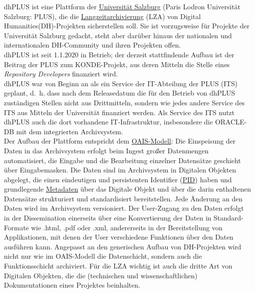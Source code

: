 \documentclass{article}
\begin{document}
    dhPLUS ist eine Plattform der \href{http://gams.uni-graz.at/o:konde.203}{Universität Salzburg} (Paris Lodron Universität Salzburg: PLUS), die die \href{http://gams.uni-graz.at/o:konde.6}{Langzeitarchivierung} (LZA) von Digital Humanities(DH)-Projekten sicherstellen soll. Sie ist vorzugsweise für Projekte der Universität Salzburg gedacht, steht aber darüber hinaus der nationalen und internationalen DH-Community und ihren Projekten offen.   	        	\\
            
        dhPLUS ist seit 1.1.2020 in Betrieb; der derzeit stattfindende Aufbau ist der Beitrag der PLUS zum KONDE-Projekt, aus deren Mitteln die Stelle eines \emph{Repository Developers} finanziert wird.\\
            
        dhPLUS war von Beginn an als ein Service der IT-Abteilung der PLUS (ITS) geplant, d. h. dass nach dem Releasedatum die für den Betrieb von dhPLUS zuständigen Stellen nicht aus Drittmitteln, sondern wie jedes andere Service des ITS aus Mitteln der Universität finanziert werden. Als Service des ITS nutzt dhPLUS auch die dort vorhandene IT-Infrastruktur, insbesondere die ORACLE-DB mit dem integrierten Archivsystem.\\
            
        Der Aufbau der Plattform entspricht dem \href{http://gams.uni-graz.at/o:konde.11}{OAIS-Modell}: Die Einspeisung der Daten in das Archivsystem erfolgt beim Ingest großer Datenmengen automatisiert, die Eingabe und die Bearbeitung einzelner Datensätze geschieht über Eingabemasken. Die Daten sind im Archivsystem in Digitalen Objekten abgelegt, die einen eindeutigen und persistenten Identifier (\href{http://gams.uni-graz.at/o:konde.12}{PID}) haben und grundlegende \href{http://gams.uni-graz.at/o:konde.25}{Metadaten} über das Digitale Objekt und über die darin enthaltenen Datensätze strukturiert und standardisiert bereitstellen. Jede Änderung an den Daten wird im Archivsystem versioniert. Der User-Zugang zu den Daten erfolgt in der Dissemination einerseits über eine Konvertierung der Daten in Standard-Formate wie .html, .pdf oder .xml, andererseits in der Bereitstellung von Applikationen, mit denen der User verschiedene Funktionen über den Daten ausführen kann. Angepasst an den generischen Aufbau von DH-Projekten wird nicht nur wie im OAIS-Modell die Datenschicht, sondern auch die Funktionsschicht archiviert. Für die LZA wichtig ist auch die dritte Art von Digitalen Objekten, die die (technischen und wissenschaftlichen) Dokumentationen eines Projektes beinhalten.\\
            
\end{document}
